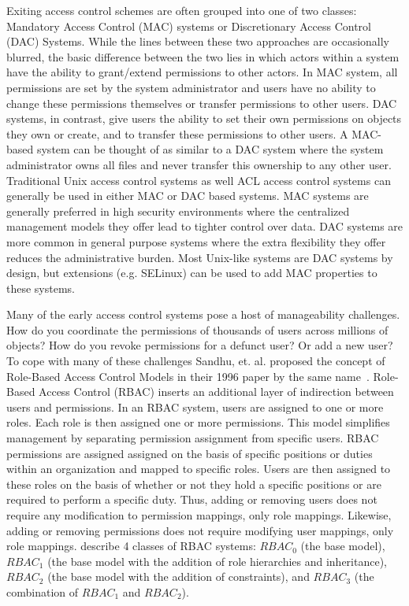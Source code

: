 \documentclass{sig-alternate}
\begin{document}
Exiting access control schemes are often grouped into one of two
classes: Mandatory Access Control (MAC) systems or Discretionary
Access Control (DAC) Systems. While the lines between these two
approaches are occasionally blurred, the basic difference between the
two lies in which actors within a system have the ability to
grant/extend permissions to other actors. In MAC system, all
permissions are set by the system administrator and users have no
ability to change these permissions themselves or transfer permissions
to other users. DAC systems, in contrast, give users the ability to
set their own permissions on objects they own or create, and to
transfer these permissions to other users. A MAC-based system can be
thought of as similar to a DAC system where the system administrator
owns all files and never transfer this ownership to any other
user. Traditional Unix access control systems as well ACL access
control systems can generally be used in either MAC or DAC based
systems. MAC systems are generally preferred in high security
environments where the centralized management models they offer lead
to tighter control over data. DAC systems are more common in general
purpose systems where the extra flexibility they offer reduces the
administrative burden. Most Unix-like systems are DAC systems by
design, but extensions (e.g. SELinux) can be used to add MAC
properties to these systems.

Many of the early access control systems pose a host of manageability
challenges. How do you coordinate the permissions of thousands of
users across millions of objects? How do you revoke permissions for a
defunct user? Or add a new user? To cope with many of these challenges
Sandhu, et. al. proposed the concept of Role-Based Access Control
Models in their 1996 paper by the same name~\cite{Sandhu1996}.
Role-Based Access Control (RBAC) inserts an additional layer of
indirection between users and permissions. In an RBAC system, users
are assigned to one or more roles. Each role is then assigned one or
more permissions. This model simplifies management by separating
permission assignment from specific users. RBAC permissions are
assigned assigned on the basis of specific positions or duties within
an organization and mapped to specific roles. Users are then assigned
to these roles on the basis of whether or not they hold a specific
positions or are required to perform a specific duty. Thus, adding or
removing users does not require any modification to permission
mappings, only role mappings. Likewise, adding or removing permissions
does not require modifying user mappings, only role
mappings. \cite{Sandhu1996} describe 4 classes of RBAC systems:
$RBAC_0$ (the base model), $RBAC_1$ (the base model with the addition
of role hierarchies and inheritance), $RBAC_2$ (the base model with
the addition of constraints), and $RBAC_3$ (the combination of
$RBAC_1$ and $RBAC_2$).
\end{document}
